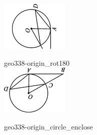 \documentclass[12pt]{article}
\begin{document}
\begin{center}
\begin{minipage}{0.32\textwidth}
\includegraphics[width=0.95\linewidth]{out_rommath_origin/items/geo338-origin/assets/figure_rot90.png}
\end{minipage}
\par\medskip
\begin{minipage}{0.32\textwidth}\centering
geo338-origin\_rot180\\
\includegraphics[width=0.95\linewidth]{out_rommath_origin/items/geo338-origin/assets/figure_rot180.png}
\end{minipage}
\hfill\begin{minipage}{0.32\textwidth}\centering
geo338-origin\_circle\_enclose\\

\end{minipage}
\end{center}
\end{document}
